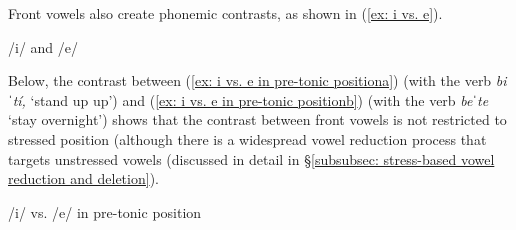 Front vowels also create phonemic contrasts, as shown in (\ref{ex: i vs. e}).

\ea\label{ex: i vs. e}
{/i/ and /e/}

    \z
\z

Below, the contrast between (\ref{ex: i vs. e in pre-tonic positiona}) (with the verb \textit{biˈtí,} ‘stand up up’) and (\ref{ex: i vs. e in pre-tonic positionb}) (with the verb \textit{beˈte} ‘stay overnight’) shows that the contrast between front vowels is not restricted to stressed position (although there is a widespread vowel reduction process that targets unstressed vowels (discussed in detail in §\ref{subsubsec: stress-based vowel reduction and deletion}).

\ea\label{ex: i vs. e in pre-tonic position}
{/i/ vs. /e/ in pre-tonic position}

    \label{ex: i vs. e in pre-tonic positiona}
        \label{ex: i vs. e in pre-tonic positionb}
    \z
\z


